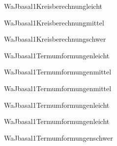 \documentclass[12pt]{article}
\begin{document}
\begin{Add}{WaJ}{basal1}{Kreisberechnung}{leicht}
\end{Add}

\begin{Add}{WaJ}{basal1}{Kreisberechnung}{mittel}
\end{Add}

\begin{Add}{WaJ}{basal1}{Kreisberechnung}{schwer}
\end{Add}

\begin{Add}{WaJ}{basal1}{Termumformungen}{leicht}
\end{Add}

\begin{Add}{WaJ}{basal1}{Termumformungen}{mittel}
\end{Add}

\begin{Add}{WaJ}{basal1}{Termumformungen}{mittel}
\end{Add}

\begin{Add}{WaJ}{basal1}{Termumformungen}{leicht}
\end{Add}

\begin{Add}{WaJ}{basal1}{Termumformungen}{leicht}
\end{Add}

\begin{Add}{WaJ}{basal1}{Termumformungen}{schwer}
\end{Add}
\end{document}
